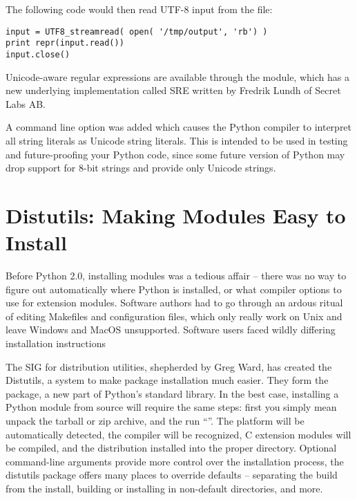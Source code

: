 \documentclass{howto}
\begin{document}
The following code would then read UTF-8 input from the file:

\begin{verbatim}
input = UTF8_streamread( open( '/tmp/output', 'rb') )
print repr(input.read())
input.close()
\end{verbatim}

Unicode-aware regular expressions are available through the
 module, which has a new underlying implementation called
SRE written by Fredrik Lundh of Secret Labs AB. 

A  command line option was added which causes the Python
compiler to interpret all string literals as Unicode string literals.
This is intended to be used in testing and future-proofing your Python
code, since some future version of Python may drop support for 8-bit
strings and provide only Unicode strings.

\section{Distutils: Making Modules Easy to Install}

Before Python 2.0, installing modules was a tedious affair -- there
was no way to figure out automatically where Python is installed, or
what compiler options to use for extension modules.  Software authors
had to go through an ardous ritual of editing Makefiles and
configuration files, which only really work on Unix and leave Windows
and MacOS unsupported.  Software users faced wildly differing
installation instructions 

The SIG for distribution utilities, shepherded by Greg Ward, has
created the Distutils, a system to make package installation much
easier.  They form the  package, a new part of
Python's standard library. In the best case, installing a Python
module from source will require the same steps: first you simply mean
unpack the tarball or zip archive, and the run ``''.  The platform will be automatically detected, the compiler
will be recognized, C extension modules will be compiled, and the
distribution installed into the proper directory.  Optional
command-line arguments provide more control over the installation
process, the distutils package offers many places to override defaults
-- separating the build from the install, building or installing in
non-default directories, and more.
\end{document}
